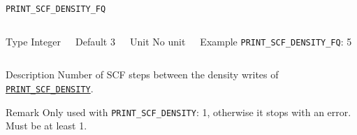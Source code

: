 \begin{frame}[allowframebreaks]{\texttt{PRINT\_SCF\_DENSITY\_FQ}} \label{PRINT_SCF_DENSITY_FQ}
\vspace*{-12pt}
\begin{columns}
\begin{block}{Type}
Integer
\end{block}

\begin{block}{Default}
3
\end{block}

\begin{block}{Unit}
No unit
\end{block}

\begin{block}{Example}
\texttt{PRINT\_SCF\_DENSITY\_FQ}: 5
\end{block}
\end{columns}

\begin{block}{Description}
Number of SCF steps between the density writes of \hyperlink{PRINT_SCF_DENSITY}{\texttt{PRINT\_SCF\_DENSITY}}.
\end{block}

\begin{block}{Remark}
Only used with \texttt{PRINT\_SCF\_DENSITY}: 1, otherwise it stops with an error. Must be at least 1.
\end{block}

\end{frame}




